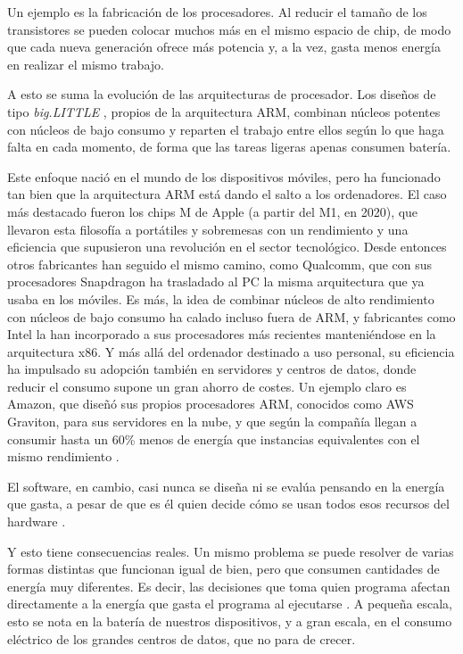 Un ejemplo es la fabricación de los procesadores. Al reducir el tamaño de los
transistores se pueden colocar muchos más en el mismo espacio de chip, de modo que cada nueva generación ofrece más
potencia y, a la vez, gasta menos energía en realizar el mismo trabajo.

A esto se suma la evolución de las arquitecturas de procesador. Los diseños de
tipo \emph{big.LITTLE} \cite{armbiglittle}, propios de la arquitectura ARM,
combinan núcleos potentes con núcleos de bajo consumo y reparten el trabajo
entre ellos según lo que haga falta en cada momento, de forma que las tareas
ligeras apenas consumen batería.

Este enfoque nació en el mundo de los dispositivos móviles, pero ha funcionado
tan bien que la arquitectura ARM está dando el salto a los ordenadores. El caso
más destacado fueron los chips M de Apple (a partir del M1, en 2020), que
llevaron esta filosofía a portátiles y sobremesas con un rendimiento y una
eficiencia que supusieron una revolución en el sector tecnológico. Desde entonces otros fabricantes han seguido el mismo camino, como Qualcomm, que con sus procesadores Snapdragon ha trasladado al PC la misma arquitectura que ya usaba en los móviles. Es más, la idea de combinar núcleos de alto rendimiento con núcleos de
bajo consumo ha calado incluso fuera de ARM, y fabricantes como Intel la han
incorporado a sus procesadores más recientes manteniéndose en la arquitectura
x86. Y más allá del ordenador destinado a uso personal, su eficiencia ha impulsado su
adopción también en servidores y centros de datos, donde reducir el consumo
supone un gran ahorro de costes. Un ejemplo claro es
Amazon, que diseñó sus propios procesadores ARM, conocidos como AWS Graviton,
para sus servidores en la nube, y que según la compañía llegan a consumir hasta
un 60\% menos de energía que instancias equivalentes con el mismo rendimiento
\cite{awsgraviton}.

El software, en cambio, casi nunca se diseña ni se evalúa pensando en la
energía que gasta, a pesar de que es él quien decide cómo se usan todos esos
recursos del hardware \cite{verdecchia2021}.

Y esto tiene consecuencias reales. Un mismo problema se puede resolver de
varias formas distintas que funcionan igual de bien, pero que consumen cantidades
de energía muy diferentes. Es decir, las decisiones que toma quien programa
afectan directamente a la energía que gasta el programa al ejecutarse
\cite{noureddine2025}. A pequeña escala, esto se nota en la batería de nuestros dispositivos, y a gran escala, en el consumo eléctrico de los grandes centros de datos, que no para de crecer.

